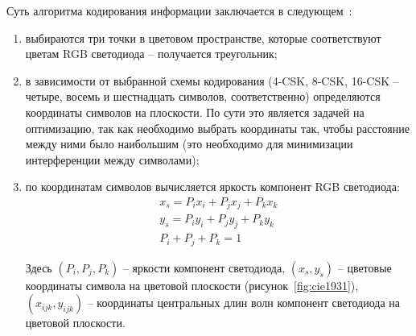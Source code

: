 Суть алгоритма кодирования информации заключается в следующем~\cite{IEEE2018}:

\begin{enumerate}
    \item выбираются три точки в цветовом пространстве, которые соответствуют цветам RGB светодиода \--- получается треугольник;
    \item в зависимости от выбранной схемы кодирования (4-CSK, 8-CSK, 16-CSK \--- четыре, восемь и шестнадцать символов, соответственно) определяются координаты символов на плоскости. По сути это является задачей на оптимизацию, так как необходимо выбрать координаты так, чтобы расстояние между ними было наибольшим (это необходимо для минимизации интерференции между символами);
    \item по координатам символов вычисляется яркость компонент RGB светодиода:
    \begin{equation}
        \begin{gathered}
            x_s = P_i x_i + P_j x_j + P_k x_k \\
            y_s = P_i y_i + P_j y_j + P_k y_k \\
            P_i + P_j + P_k = 1
        \end{gathered}
    \end{equation}

    Здесь $(P_i, P_j, P_k)$ \--- яркости компонент светодиода, $(x_s, y_s)$ \--- цветовые координаты символа на цветовой плоскости (рисунок~\ref{fig:cie1931}), $(x_{ijk}, y_{ijk})$ \--- координаты центральных длин волн компонент светодиода на цветовой плоскости. 
\end{enumerate}


